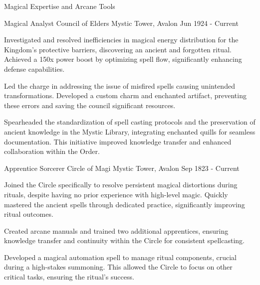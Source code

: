 \documentclass[11pt, a4paper]{awesome-cv}
\begin{document}
\begin{cvsubsection}{Magical Expertise and Arcane Tools}
\begin{cventries}
\cventry
{Magical Analyst}
{Council of Elders}
{Mystic Tower, Avalon}
{Jun 1924 - Current} 
{
\begin{cvitems}
    \item{\normalsize Investigated and resolved inefficiencies in
magical energy distribution for the Kingdom's protective barriers,
discovering an ancient and forgotten ritual. Achieved a 150x power boost
by optimizing spell flow, significantly enhancing defense capabilities.}
    \item{\normalsize Led the charge in addressing the issue of misfired
spells causing unintended transformations. Developed a custom charm and
enchanted artifact, preventing these errors and saving the council
significant resources.}
    \item{\normalsize Spearheaded the standardization of spell casting
protocols and the preservation of ancient knowledge in the Mystic
Library, integrating enchanted quills for seamless documentation. This
initiative improved knowledge transfer and enhanced collaboration within
the Order.}
\end{cvitems}
}
\vspace{4mm}
\cventry
{Apprentice Sorcerer}
{Circle of Magi}
{Mystic Tower, Avalon}
{Sep 1823 - Current} 
{
\begin{cvitems}
    \item{\normalsize Joined the Circle specifically to resolve
persistent magical distortions during rituals, despite having no prior
experience with high-level magic. Quickly mastered the ancient spells
through dedicated practice, significantly improving ritual outcomes.}
    \item{\normalsize Created arcane manuals and trained two additional
apprentices, ensuring knowledge transfer and continuity within the
Circle for consistent spellcasting.}
    \item{\normalsize Developed a magical automation spell to manage
ritual components, crucial during a high-stakes summoning. This allowed
the Circle to focus on other critical tasks, ensuring the ritual's
success.}
\end{cvitems}
}
\vspace{4mm}
\end{cventries}



\vspace{4mm}
\begin{cventries}



\end{cventries}
\end{cvsubsection}
\end{document}
